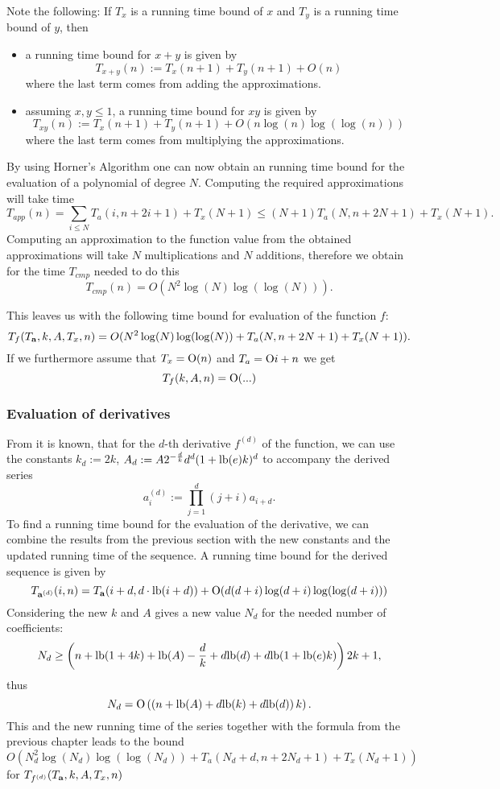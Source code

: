 			Note the following:
			If $T_x$ is a running time bound of $x$ and $T_y$ is a running time bound of $y$, then
			\begin{itemize}
				\item a running time bound for $x+y$ is given by
				\[ T_{x+y}(n) := T_x(n+1)+ T_y(n+1) + O(n) \]
				where the last term comes from adding the approximations.
				\item assuming $x,y\leq 1$, a running time bound for $xy$ is given by
				\[ T_{xy}(n):= T_x(n+1) + T_y(n+1) + O(n\log(n)\log(\log(n))) \]
				where the last term comes from multiplying the approximations.
			\end{itemize}
			By using Horner's Algorithm one can now obtain an running time bound for the evaluation of a polynomial of degree $N$.
			Computing the required approximations will take time
			\[ T_{app}(n) = \sum_{i\leq N} T_a(i,n+2i+1) + T_x(N+1) \leq (N+1)T_a(N,n+2N+1) + T_x(N+1). \]
			Computing an approximation to the function value from the obtained approximations will take $N$ multiplications and $N$ additions, therefore we obtain for the time $T_{cmp}$ needed to do this
			\[ T_{cmp}(n) =O(N^2\log(N)\log(\log(N))). \]
			
			This leaves us with the following time bound for evaluation of the function $f$:
			\[ T_f(T_{\mathbf{a}},k,A,T_x,n) = O(N^2\log(N)\log(\log(N))+ T_a(N,n+2N +1) + T_x(N+1)). \]
			If we furthermore assume that $T_x= \mathrm O(n)$ and $T_a = \mathrm O i+n$ we get
			\[ T_f(k,A,n) = \mathrm O(...) \]

		\subsubsection{Evaluation of derivatives}

			From \cite{gevrey} it is known, that for the $d$-th derivative $f^{(d)}$ of the function, we can use the constants $k_d:= 2k$, $A_d :=A 2^{-\frac dk} d^d (1+\mathrm{lb}(e) k)^d$ to accompany the derived series
			\[ a^{(d)}_i:= \prod_{j=1}^d (j+i)a_{i+d}. \]
			To find a running time bound for the evaluation of the derivative, we can combine the results from the previous section with the new constants and the updated running time of the sequence.
			A running time bound for the derived sequence is given by
			\[ T_{\mathbf{a}^{(d)}}(i,n) = T_{\mathbf{a}}(i+d, d\cdot \mathrm{lb}(i+d)) + \mathrm O(d(d+i) \log(d+i)\log(\log(d+i))) \]
			Considering the new $k$ and $A$ gives a new value $N_d$ for the needed number of coefficients:
			\[ N_d \geq \left(n + \mathrm{lb}(1+4k) + \mathrm{lb}(A) - \frac dk + d\mathrm{lb}(d) + d\mathrm{lb}(1+\mathrm{lb}(e)k)\right)2k+1, \]
			thus
			\[ N_d = \mathrm O\left(\left(n + \mathrm{lb}(A) + d\mathrm{lb}(k) + d\mathrm{lb}(d)\right)k \right). \]
			This and the new running time of the series together with the formula from the previous chapter leads to the bound
			\[ O(N_d^2\log(N_d)\log(\log(N_d))+ T_a(N_d+d,n+2N_d +1) + T_x(N_d+1)) \]
			for $T_{f^{(d)}}(T_{\mathbf{a}},k,A,T_x,n)$



